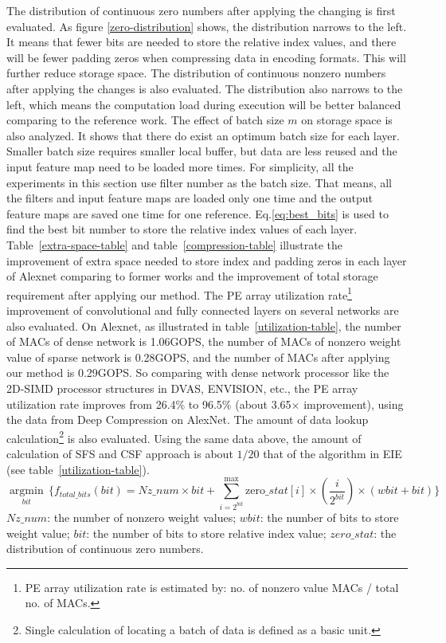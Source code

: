 \documentclass{article} %
\begin{document}
The distribution of continuous zero numbers after applying the changing is first evaluated. As figure \ref{zero-distribution} shows, the distribution narrows to the left. It means that fewer bits are needed to store the relative index values, and there will be fewer padding zeros when compressing data in encoding formats. This will further reduce storage space. The distribution of continuous nonzero numbers after applying the changes is also evaluated. The distribution also narrows to the left, which means the computation load during execution will be better balanced comparing to the reference work\citep{han2015deep_compression}. The effect of batch size $m$ on storage space is also analyzed. It shows that there do exist an optimum batch size for each layer. Smaller batch size requires smaller local buffer, but data are less reused and the input feature map need to be loaded more times. For simplicity, all the experiments in this section use filter number as the batch size. That means, all the filters and input feature maps are loaded only one time and the output feature maps are saved one time for one reference. Eq.\ref{eq:best_bits} is used to find the best bit number to store the relative index values of each layer. Table~\ref{extra-space-table} and table~\ref{compression-table} illustrate the improvement of extra space needed to store index and padding zeros in each layer of Alexnet comparing to former works and the improvement of total storage requirement after applying our method. The PE array utilization rate\footnote{PE array utilization rate is estimated by: no. of nonzero value MACs / total no. of MACs.} improvement of convolutional and fully connected layers on several networks are also evaluated. On Alexnet, as illustrated in table~\ref{utilization-table}, the number of MACs of dense network is 1.06GOPS, the number of MACs of nonzero weight value of sparse network is 0.28GOPS, and the number of MACs after applying our method is 0.29GOPS. So comparing with dense network processor like the 2D-SIMD processor structures in DVAS, ENVISION, etc., the PE array utilization rate improves from 26.4\% to 96.5\% (about 3.65$\times$ improvement), using the data from Deep Compression on AlexNet. The amount of data lookup calculation\footnote{Single calculation of locating a batch of data is defined as a basic unit.} is also evaluated. Using the same data above, the amount of calculation of SFS and CSF approach is about $1/20$ that of the algorithm in EIE (see table~\ref{utilization-table}).
\begin{equation}
\label{eq:best_bits}
\underset{bit}{\mathop{\arg \min }}\,\{{{f}_{total\_bits}}(bit)=Nz\_num\times bit+\sum\limits_{i={{2}^{bit}}}^{{{\max }}}{\text{zero}\_stat[i]\times (\frac{i}{{{2}^{bit}}})}\times (wbit+bit)\}
\end{equation}
$Nz\_num$: the number of nonzero weight values;
$wbit$: the number of bits to store weight value;
$bit$: the number of bits to store relative index value;
$zero\_stat$: the distribution of continuous zero numbers.
\end{document}
